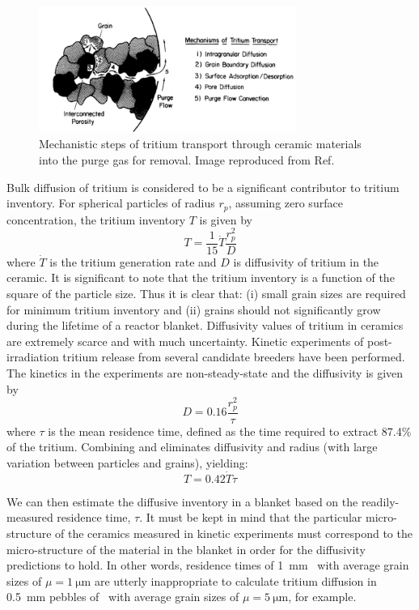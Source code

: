 \begin{figure}[ht]
	\centering
	\includegraphics[width=0.75\textwidth]{figures/mechanisms_tritium_transport} 
	\caption{Mechanistic steps of tritium transport through ceramic materials into the purge gas for removal. Image reproduced from Ref.\cite{hastings1989fabrication}}
	\label{fig:mechanisms_tritium_transport}
\end{figure}

Bulk diffusion of tritium is considered to be a significant contributor to tritium inventory. For spherical particles of radius $r_p$, assuming zero surface concentration, the tritium inventory $T$ is given by 
\begin{equation}\label{eq:inventory-diff}
T = \frac{1}{15}\dot{T}\frac{r_p^2}{D}
\end{equation}
where $\dot{T}$ is the tritium generation rate and $D$ is diffusivity of tritium in the ceramic. It is significant to note that the tritium inventory is a function of the square of the particle size. Thus it is clear that: (i) small grain sizes are required for minimum tritium inventory and (ii) grains should not significantly grow during the lifetime of a reactor blanket. Diffusivity values of tritium in ceramics are extremely scarce and with much uncertainty. Kinetic experiments of post-irradiation tritium release from several candidate breeders have been performed. The kinetics in the experiments are non-steady-state and the diffusivity is given by 
\begin{equation}\label{eq:exp-diff}
D = 0.16 \frac{r_p^2}{\tau}
\end{equation}
where $\tau$ is the mean residence time, defined as the time required to extract 87.4\% of the tritium. Combining  and  eliminates diffusivity and radius (with large variation between particles and grains), yielding:
\begin{equation}
T = 0.42 \dot{T}\tau
\end{equation}

We can then estimate the diffusive inventory in a blanket based on the readily-measured residence time, $\tau$. It must be kept in mind that the particular micro-structure of the ceramics measured in kinetic experiments must correspond to the micro-structure of the material in the blanket in order for the diffusivity predictions to hold. In other words, residence times of \SI{1}{\milli\meter} \lit~with average grain sizes of $\mu = \SI{1}{\micro\meter}$ are utterly inappropriate to calculate tritium diffusion in \SI{0.5}{\milli\meter} pebbles of \lis~with average grain sizes of $\mu = \SI{5}{\micro\meter}$, for example.

